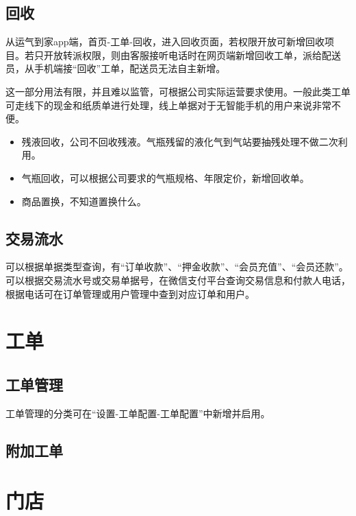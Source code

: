 \documentclass[UTF8]{ctexart}
\begin{document}
\subsection{回收}

从运气到家app端，首页-工单-回收，进入回收页面，若权限开放可新增回收项目。若只开放转派权限，则由客服接听电话时在网页端新增回收工单，派给配送员，从手机端接“回收”工单，配送员无法自主新增。

这一部分用法有限，并且难以监管，可根据公司实际运营要求使用。一般此类工单可走线下的现金和纸质单进行处理，线上单据对于无智能手机的用户来说非常不便。

\begin{itemize}
	
	\item 残液回收，公司不回收残液。气瓶残留的液化气到气站要抽残处理不做二次利用。
	
	\item 气瓶回收，可以根据公司要求的气瓶规格、年限定价，新增回收单。
	
	\item 商品置换，不知道置换什么。
	
\end{itemize}


\subsection{交易流水}

可以根据单据类型查询，有“订单收款”、“押金收款”、“会员充值”、“会员还款”。
可以根据交易流水号或交易单据号，在微信支付平台查询交易信息和付款人电话，根据电话可在订单管理或用户管理中查到对应订单和用户。


\section{工单}

\subsection{工单管理}

工单管理的分类可在“设置-工单配置-工单配置”中新增并启用。

\subsection{附加工单}




\section{门店}
\end{document}

